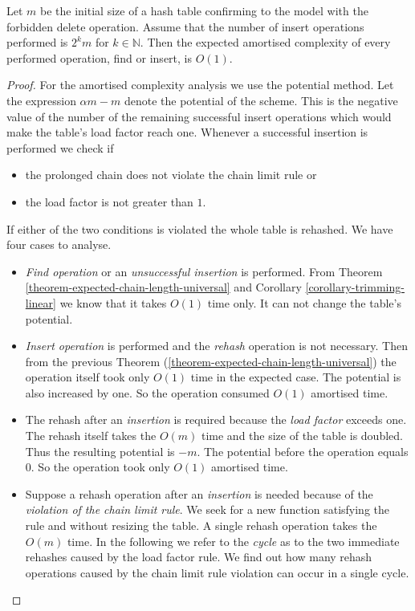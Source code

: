 \begin{theorem}
Let $m$ be the initial size of a hash table confirming to the model with the forbidden delete operation. Assume that the number of insert operations performed is $2^k m$ for $k \in \mathbb{N}$. Then the expected amortised complexity of every performed operation, find or insert, is $O(1)$.
\end{theorem}
\begin{proof}
For the amortised complexity analysis we use the potential method. Let the expression $\alpha m - m$ denote the potential of the scheme. This is the negative value of the number of the remaining successful insert operations which would make the table's load factor reach one. Whenever a successful insertion is performed we check if 
\begin{itemize} 
\item the prolonged chain does not violate the chain limit rule or
\item the load factor is not greater than $1$.
\end{itemize} If either of the two conditions is violated the whole table is rehashed. We have four cases to analyse.
\begin{itemize}
\item \emph{Find operation} or an \emph{unsuccessful insertion} is performed. From Theorem \ref{theorem-expected-chain-length-universal} and Corollary \ref{corollary-trimming-linear} we know that it takes $O(1)$ time only. It can not change the table's potential.

\item \emph{Insert operation} is performed and the \emph{rehash} operation is not necessary. Then from the previous Theorem (\ref{theorem-expected-chain-length-universal}) the operation itself took only $O(1)$ time in the expected case. The potential is also increased by one. So the operation consumed $O(1)$ amortised time.

\item The rehash after an \emph{insertion} is required because the \emph{load factor} exceeds one. The rehash itself takes the $O(m)$ time and the size of the table is doubled. Thus the resulting potential is $-m$. The potential before the operation equals $0$. So the operation took only $O(1)$ amortised time.

\item Suppose a rehash operation after an \emph{insertion} is needed because of the \emph{violation of the chain limit rule}. We seek for a new function satisfying the rule and without resizing the table. A single rehash operation takes the $O(m)$ time. In the following we refer to the \emph{cycle} as to the two immediate rehashes caused by the load factor rule. We find out how many rehash operations caused by the chain limit rule violation can occur in a single cycle. 


\end{itemize}
\end{proof}
